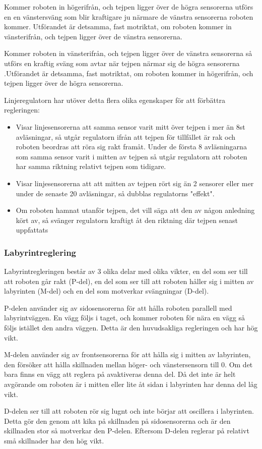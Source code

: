 Kommer roboten in högerifrån, och tejpen ligger över de högra sensorerna 
utförs en en vänstersväng som blir kraftigare ju närmare de vänstra 
sensorerna roboten kommer. Utförandet är detsamma, fast motriktat, om roboten 
kommer in vänsterifrån, och tejpen ligger över de vänstra sensorerna.

Kommer roboten in vänsterifrån, och tejpen ligger över de vänstra sensorerna 
så utförs en kraftig sväng som avtar när tejpen närmar sig de högra sensorerna
.Utförandet är detsamma, fast motriktat, om roboten kommer in högerifrån, och 
tejpen ligger över de högra sensorerna.


Linjeregulatorn har utöver detta flera olika egenskaper för att förbättra 
regleringen:
\begin{itemize}
\item Visar linjesensorerna att samma sensor varit mitt över tejpen i mer än 8st 
avläsningar, så utgår regulatorn ifrån att tejpen för tillfället är rak och roboten 
beordras att röra sig rakt framåt. Under de första 8 avläsningarna som samma 
sensor varit i mitten av tejpen så utgår regulatorn att roboten har samma riktning 
relativt tejpen som tidigare.
\item Visar linjesensorerna att att mitten av tejpen rört sig än 2 sensorer eller mer
 under de senaste 20 avläsningar, så dubblas regulatorns "effekt".
\item Om roboten hamnat utanför tejpen, det vill säga att den av någon anledning 
kört av, så svänger regulatorn kraftigt åt den riktning där tejpen senast uppfattats
\end{itemize}



\subsubsection{Labyrintreglering}
\label{sec:labyrintreglering}
Labyrintregleringen består av 3 olika delar med olika vikter,
en del som ser till att roboten går rakt (P-del), en del som ser till att
roboten håller sig i mitten av labyrinten (M-del) och en del som motverkar
svängningar (D-del).


P-delen använder sig av sidosensorerna för att hålla roboten parallell med
labyrintväggen. En vägg följs i taget, och kommer roboten för nära en vägg så
följs istället den andra väggen. Detta är den huvudsakliga regleringen och har
hög vikt.


M-delen använder sig av frontsensorerna för att hålla sig i mitten av
labyrinten, den försöker att hålla skillnaden mellan höger- och vänstersensorn
till 0. Om det bara finns en vägg att reglera på avaktiveras denna del. Då det
inte är helt avgörande om roboten är i mitten eller lite åt sidan i labyrinten
har denna del låg vikt.


D-delen ser till att roboten rör sig lugnt och inte börjar att oscillera i
labyrinten. Detta gör den genom att kika på skillnaden på sidosensorerna och är
den skillnaden stor så motverkar den P-delen. Eftersom D-delen reglerar på
relativt små skillnader har den hög vikt.

\label{reglering}



	

